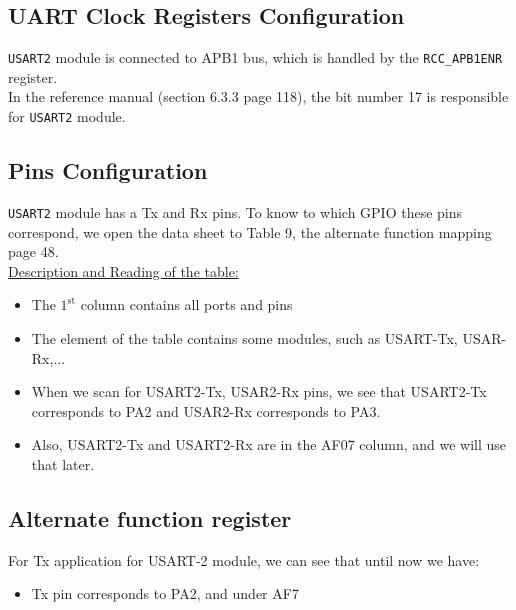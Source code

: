 \documentclass[12pt,a4paper]{book}
\begin{document}
\subsection{UART Clock Registers Configuration}

\verb|USART2| module is connected to APB1 bus, which is handled by the \verb|RCC_APB1ENR| register.\\

In the reference manual (section 6.3.3 page 118), the bit number 17 is responsible for \verb|USART2| module.

\subsection{Pins Configuration}
\label{Sub:UART:Pins_Conf}

\verb|USART2| module has a Tx and Rx pins. To know to which GPIO these pins correspond, we open the data sheet to Table 9, the alternate function mapping page 48.\\

\underline{Description and Reading of the table:}

\begin{itemize}


\item The $\mathrm{1}^\mathrm{st}$ column contains all  ports and pins

\item  The element of the table contains some modules, such as USART-Tx, USAR-Rx,...

\item  When we scan for USART2-Tx, USAR2-Rx pins, we see that USART2-Tx corresponds to PA2 and USAR2-Rx corresponds to PA3.

\item  Also, USART2-Tx and USART2-Rx are in the AF07 column, and we will use that later.

\end{itemize}

\subsection{Alternate function register}

For Tx application for USART-2 module, we can see that until now we have:

    \begin{itemize}
    \item  Tx pin corresponds to PA2, and under AF7
    \end{itemize}
\end{document}
